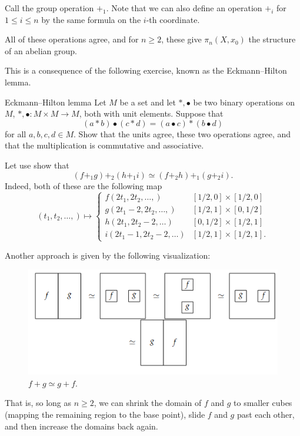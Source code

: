 \documentclass[ma3408.tex]{subfiles}
\begin{document}
\begin{Rem}
	Call the group operation $+_1$. Note that we can also define an operation $+_i$ for $1 \le i \le n$ by the same formula on the $i$-th coordinate. 
\end{Rem}
\begin{Thm}
	All of these operations agree, and for $n \ge 2$, these give $\pi_n(X,x_0)$ the structure of an abelian group. 
\end{Thm}
This is a consequence of the following exercise, known as the Eckmann--Hilton lemma. 
\begin{exercise}{Eckmann--Hilton lemma}{}
	Let $M$ be a set and let $\ast,\bullet$ be two binary operations on $M$, $\ast,\bullet \colon M \times M \to M$, both with unit elements. Suppose that 
	\[
(a \ast b) \bullet (c \ast d) = (a \bullet c) \ast (b \bullet d)
	\]
	for all $a,b,c,d \in M$. Show that the units agree, these two operations agree, and that the multiplication is commutative and associative. 
\end{exercise}
\begin{Rem}
	Let use show that 
	\[
(f+_1 g) +_2 (h+_1 i) \simeq (f+_2 h) +_1 (g+_2 i). 
	\]
	Indeed, both of these are the following map
	\[
(t_1,t_2,\ldots,) \mapsto \begin{cases}
	f(2t_1,2t_2,\ldots,) &[1/2,0] \times [1/2,0]\\
	g(2t_1-2,2t_2,\ldots,) & [1/2,1] \times [0,1/2]\\
h(2t_1,2t_2-2,\ldots) & [0,1/2] \times [1/2,1]\\
i(2t_1-1,2t_2-2,\ldots) & [1/2,1] \times [1/2,1].
\end{cases}
	\]
\end{Rem}
\begin{Rem}
	Another approach is given by the following visualization: 
\begin{figure}[h!] \centering\includegraphics[scale = 0.5]{abelian.png}\caption{$f + g \simeq g +f $.}\label{fig:marginfig}\end{figure}
	That is, so long as $n \ge 2$, we can shrink the domain of $f$ and $g$ to smaller cubes (mapping the remaining region to the base point), slide $f$ and $g$ past each other, and then increase the domains back again. 
\end{Rem}
\end{document}
